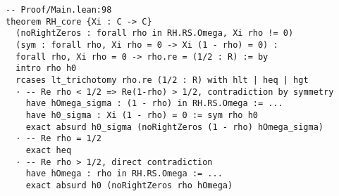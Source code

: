\documentclass[12pt,a4paper]{article}
\begin{document}
\begin{lstlisting}[language=Lean]
-- Proof/Main.lean:98
theorem RH_core {Xi : C -> C}
  (noRightZeros : forall rho in RH.RS.Omega, Xi rho != 0)
  (sym : forall rho, Xi rho = 0 -> Xi (1 - rho) = 0) :
  forall rho, Xi rho = 0 -> rho.re = (1/2 : R) := by
  intro rho h0
  rcases lt_trichotomy rho.re (1/2 : R) with hlt | heq | hgt
  · -- Re rho < 1/2 => Re(1-rho) > 1/2, contradiction by symmetry
    have hOmega_sigma : (1 - rho) in RH.RS.Omega := ...
    have h0_sigma : Xi (1 - rho) = 0 := sym rho h0
    exact absurd h0_sigma (noRightZeros (1 - rho) hOmega_sigma)
  · -- Re rho = 1/2
    exact heq
  · -- Re rho > 1/2, direct contradiction
    have hOmega : rho in RH.RS.Omega := ...
    exact absurd h0 (noRightZeros rho hOmega)
\end{lstlisting}
\end{document}
